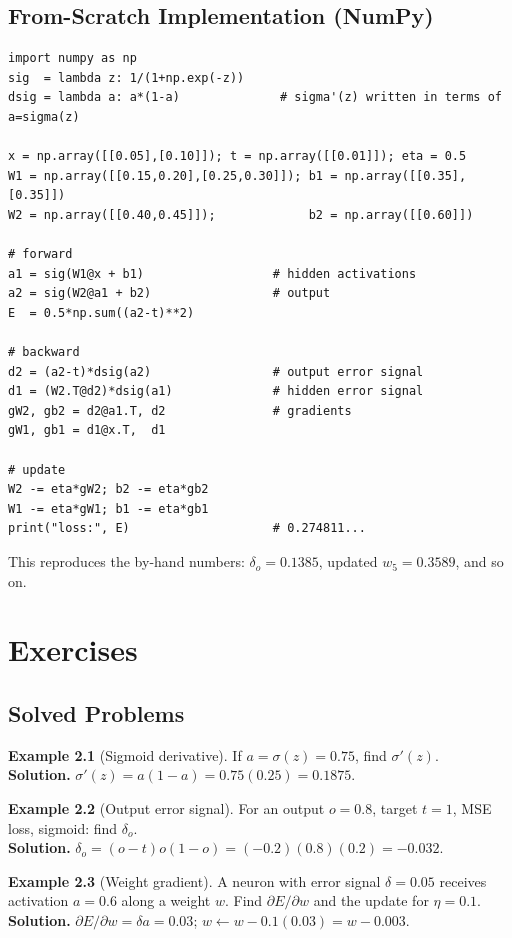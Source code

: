 \documentclass[11pt,a4paper]{report}
\theoremstyle{definition}
\newtheorem{example}{Example}[chapter]
\theoremstyle{remark}
\begin{document}
\section{From-Scratch Implementation (NumPy)}
\begin{lstlisting}[style=python,caption={The worked example in NumPy.}]
import numpy as np
sig  = lambda z: 1/(1+np.exp(-z))
dsig = lambda a: a*(1-a)              # sigma'(z) written in terms of a=sigma(z)

x = np.array([[0.05],[0.10]]); t = np.array([[0.01]]); eta = 0.5
W1 = np.array([[0.15,0.20],[0.25,0.30]]); b1 = np.array([[0.35],[0.35]])
W2 = np.array([[0.40,0.45]]);             b2 = np.array([[0.60]])

# forward
a1 = sig(W1@x + b1)                  # hidden activations
a2 = sig(W2@a1 + b2)                 # output
E  = 0.5*np.sum((a2-t)**2)

# backward
d2 = (a2-t)*dsig(a2)                 # output error signal
d1 = (W2.T@d2)*dsig(a1)              # hidden error signal
gW2, gb2 = d2@a1.T, d2               # gradients
gW1, gb1 = d1@x.T,  d1

# update
W2 -= eta*gW2; b2 -= eta*gb2
W1 -= eta*gW1; b1 -= eta*gb1
print("loss:", E)                    # 0.274811...
\end{lstlisting}
This reproduces the by-hand numbers: $\delta_o=0.1385$, updated
$w_5=0.3589$, and so on.

\chapter{Exercises}

\section{Solved Problems}
\begin{example}[Sigmoid derivative]
If $a=\sigma(z)=0.75$, find $\sigma'(z)$.\\
\textbf{Solution.} $\sigma'(z)=a(1-a)=0.75(0.25)=0.1875.$
\end{example}
\begin{example}[Output error signal]
For an output $o=0.8$, target $t=1$, MSE loss, sigmoid: find $\delta_o$.\\
\textbf{Solution.} $\delta_o=(o-t)o(1-o)=(-0.2)(0.8)(0.2)=-0.032.$
\end{example}
\begin{example}[Weight gradient]
A neuron with error signal $\delta=0.05$ receives activation $a=0.6$ along a
weight $w$. Find $\partial E/\partial w$ and the update for $\eta=0.1$.\\
\textbf{Solution.} $\partial E/\partial w=\delta a=0.03$; $w\leftarrow w-0.1(0.03)=w-0.003.$
\end{example}
\end{document}
